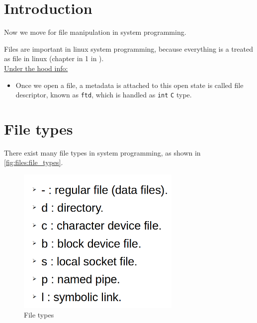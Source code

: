 \documentclass[12pt,a4paper]{book}
\begin{document}
\section{Introduction}

Now we move for file manipulation in system programming.

Files are important in linux system programming, because everything is a treated as file in linux (chapter in 1 in \cite{book_Linux_System_Programming_Robert_Love}).\\


\underline{Under the hood info:}

\begin{itemize}
    \item Once we open a file, a metadata is attached to this open state is called file descriptor, known as \verb|ftd|, which is handled as \verb|int| \verb|C| type.
\end{itemize}


\section{File types}

There exist many file types in system programming, as shown in \autoref{fig:files:file_types}.

\begin{figure}[h]
\centering
\includegraphics[width = 0.7\textwidth, frame]{Figures/files/file_types.png}
\caption{File types}
\label{fig:files:file_types}
\end{figure}



\end{document}
